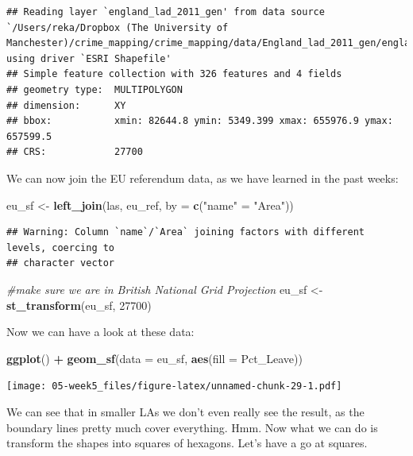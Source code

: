 \documentclass[]{book}
\newenvironment{Shaded}{\begin{snugshade}}{\end{snugshade}}
\newcommand{\CommentTok}[1]{\textcolor[rgb]{0.56,0.35,0.01}{\textit{#1}}}
\newcommand{\DataTypeTok}[1]{\textcolor[rgb]{0.13,0.29,0.53}{#1}}
\newcommand{\DecValTok}[1]{\textcolor[rgb]{0.00,0.00,0.81}{#1}}
\newcommand{\KeywordTok}[1]{\textcolor[rgb]{0.13,0.29,0.53}{\textbf{#1}}}
\newcommand{\NormalTok}[1]{#1}
\newcommand{\OperatorTok}[1]{\textcolor[rgb]{0.81,0.36,0.00}{\textbf{#1}}}
\newcommand{\StringTok}[1]{\textcolor[rgb]{0.31,0.60,0.02}{#1}}
\begin{document}
\begin{verbatim}
## Reading layer `england_lad_2011_gen' from data source `/Users/reka/Dropbox (The University of Manchester)/crime_mapping/crime_mapping/data/England_lad_2011_gen/england_lad_2011_gen.shp' using driver `ESRI Shapefile'
## Simple feature collection with 326 features and 4 fields
## geometry type:  MULTIPOLYGON
## dimension:      XY
## bbox:           xmin: 82644.8 ymin: 5349.399 xmax: 655976.9 ymax: 657599.5
## CRS:            27700
\end{verbatim}

We can now join the EU referendum data, as we have learned in the past weeks:

\begin{Shaded}
\begin{Highlighting}[]
\NormalTok{eu_sf <-}\StringTok{ }\KeywordTok{left_join}\NormalTok{(las, eu_ref, }\DataTypeTok{by =} \KeywordTok{c}\NormalTok{(}\StringTok{"name"}\NormalTok{ =}\StringTok{ "Area"}\NormalTok{))}
\end{Highlighting}
\end{Shaded}

\begin{verbatim}
## Warning: Column `name`/`Area` joining factors with different levels, coercing to
## character vector
\end{verbatim}

\begin{Shaded}
\begin{Highlighting}[]
\CommentTok{#make sure we are in British National Grid Projection}
\NormalTok{eu_sf <-}\StringTok{ }\KeywordTok{st_transform}\NormalTok{(eu_sf, }\DecValTok{27700}\NormalTok{)}
\end{Highlighting}
\end{Shaded}

Now we can have a look at these data:

\begin{Shaded}
\begin{Highlighting}[]
\KeywordTok{ggplot}\NormalTok{() }\OperatorTok{+}
\StringTok{  }\KeywordTok{geom_sf}\NormalTok{(}\DataTypeTok{data =}\NormalTok{ eu_sf, }\KeywordTok{aes}\NormalTok{(}\DataTypeTok{fill =}\NormalTok{ Pct_Leave)) }
\end{Highlighting}
\end{Shaded}

\texttt{[image: 05-week5\_files/figure-latex/unnamed-chunk-29-1.pdf]}

We can see that in smaller LAs we don't even really see the result, as the boundary lines pretty much cover everything. Hmm. Now what we can do is transform the shapes into squares of hexagons. Let's have a go at squares.
\end{document}
